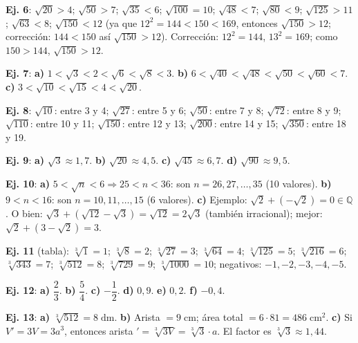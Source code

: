 \documentclass[11pt, letterpaper]{article}
\begin{document}
\begin{tcolorbox}[answerbox, title={Bloque B — Comparación, orden y estimación}]

\noindent\textbf{Ej. 6}: $\sqrt{20}>4$; $\sqrt{50}>7$; $\sqrt{35}<6$; $\sqrt{100}=10$; $\sqrt{48}<7$; $\sqrt{80}<9$; $\sqrt{125}>11$; $\sqrt{63}<8$; $\sqrt{150}<12$ (ya que $12^2=144<150<169$, entonces $\sqrt{150}>12$; corrección: $144<150$ así $\sqrt{150}>12$). Corrección: $12^2=144$, $13^2=169$; como $150>144$, $\sqrt{150}>12$.

\medskip

\noindent\textbf{Ej. 7}: \textbf{a)} $1<\sqrt{3}<2<\sqrt{6}<\sqrt{8}<3$. \textbf{b)} $6<\sqrt{40}<\sqrt{48}<\sqrt{50}<\sqrt{60}<7$. \textbf{c)} $3<\sqrt{10}<\sqrt{15}<4<\sqrt{20}$.

\medskip

\noindent\textbf{Ej. 8}: $\sqrt{10}$: entre 3 y 4; $\sqrt{27}$: entre 5 y 6; $\sqrt{50}$: entre 7 y 8; $\sqrt{72}$: entre 8 y 9; $\sqrt{110}$: entre 10 y 11; $\sqrt{150}$: entre 12 y 13; $\sqrt{200}$: entre 14 y 15; $\sqrt{350}$: entre 18 y 19.

\medskip

\noindent\textbf{Ej. 9}: \textbf{a)} $\sqrt{3}\approx1{,}7$. \textbf{b)} $\sqrt{20}\approx4{,}5$. \textbf{c)} $\sqrt{45}\approx6{,}7$. \textbf{d)} $\sqrt{90}\approx9{,}5$.

\medskip

\noindent\textbf{Ej. 10}: \textbf{a)} $5<\sqrt{n}<6\Rightarrow25<n<36$: son $n=26,27,\ldots,35$ (10 valores). \textbf{b)} $9<n<16$: son $n=10,11,\ldots,15$ (6 valores). \textbf{c)} Ejemplo: $\sqrt{2}+(-\sqrt{2})=0\in\mathbb{Q}$. O bien: $\sqrt{3}+(\sqrt{12}-\sqrt{3})=\sqrt{12}=2\sqrt{3}$ (también irracional); mejor: $\sqrt{2}+(3-\sqrt{2})=3$.
\end{tcolorbox}

\medskip

\begin{tcolorbox}[answerbox, title={Bloque C — Raíz cúbica}]

\noindent\textbf{Ej. 11} (tabla): $\sqrt[3]{1}=1$; $\sqrt[3]{8}=2$; $\sqrt[3]{27}=3$; $\sqrt[3]{64}=4$; $\sqrt[3]{125}=5$; $\sqrt[3]{216}=6$; $\sqrt[3]{343}=7$; $\sqrt[3]{512}=8$; $\sqrt[3]{729}=9$; $\sqrt[3]{1000}=10$; negativos: $-1,-2,-3,-4,-5$.

\medskip

\noindent\textbf{Ej. 12}: \textbf{a)} $\dfrac{2}{3}$. \textbf{b)} $\dfrac{5}{4}$. \textbf{c)} $-\dfrac{1}{2}$. \textbf{d)} $0{,}9$. \textbf{e)} $0{,}2$. \textbf{f)} $-0{,}4$.

\medskip

\noindent\textbf{Ej. 13}: \textbf{a)} $\sqrt[3]{512}=8\;\text{dm}$. \textbf{b)} Arista $=9\;\text{cm}$; área total $=6\cdot81=486\;\text{cm}^2$. \textbf{c)} Si $V'=3V=3a^3$, entonces arista $'=\sqrt[3]{3V}=\sqrt[3]{3}\cdot a$. El factor es $\sqrt[3]{3}\approx1{,}44$.
\end{tcolorbox}
\end{document}
